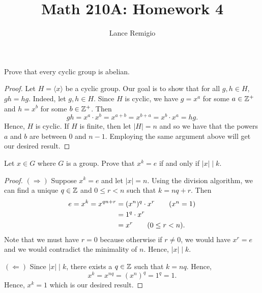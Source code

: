 \documentclass[a4paper]{article}
\title{Math 210A: Homework 4}
\author{Lance Remigio}
\begin{document}
\maketitle
\begin{problem}
   Prove that every cyclic group is abelian. 
\end{problem}

\begin{proof}
Let \( H = \langle x \rangle \) be a cyclic group. Our goal is to show that for all \( g,h \in H \), \( gh = hg \). Indeed, let \( g,h \in H  \). Since \( H  \) is cyclic, we have \( g = x^{a} \) for some \( a \in \mathbb{Z}^{+} \) and \( h = x^{b} \) for some \( b \in \mathbb{Z}^{+} \). Then   
\[  gh = x^{a} \cdot x^{b} = x^{a + b} = x^{b + a} = x^{b} \cdot x^{a} = hg. \]
Hence, \( H  \) is cyclic. If \( H  \) is finite, then let \( | H  |  = n  \) and so we have that the powers \( a  \) and \( b  \) are between \( 0 \) and \( n - 1  \). Employing the same argument above will get our desired result.
\end{proof}

\begin{problem}
    Let \( x \in G  \) where \( G  \) is a group. Prove that \( x^{k} = e  \) if and only if \( | x  |  \mid k \).
\end{problem}
\begin{proof}
\( (\Longrightarrow) \) Suppose \( x^{k} = e  \) and let \( | x  |  = n  \). Using the division algorithm, we can find a unique \( q \in \mathbb{Z}  \) and \( 0 \leq r < n  \) such that \( k = n q + r  \). Then 
\begin{align*}
    e = x^{k} =  x^{qn+r} &= (x^{n})^{q} \cdot x^{r} \tag{\( x^{n} = 1  \)} \\ 
                     &= 1^{q} \cdot x^{r} \\
                     &= x^{r} \tag{\( 0 \leq r < n \)}.
\end{align*}
Note that we must have \( r = 0 \) because otherwise if \( r \neq 0  \), we would have \( x^{r} = e  \) and we would contradict the minimality of \( n  \). Hence, \( | x  |  \mid k \). 

\( (\Longleftarrow) \) Since \( | x  |  \mid k  \), there exists a \( q \in \mathbb{Z}  \) such that \( k = n q  \). Hence, 
\[  x^{k} = x^{n q} = (x^{n})^{q} = 1^{q} = 1. \]
Hence, \( x^{k} = 1  \) which is our desired result.
\end{proof}
\end{document}
